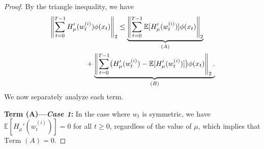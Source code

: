 \documentclass[letterpaper,10pt,conference]{ieeeconf}
\theoremstyle{plain} %
\theoremstyle{plain} %
\theoremstyle{plain} %
\theoremstyle{plain}
\begin{document}
\begin{proof}
By the triangle inequality, we have
\begin{align*}
&\left\| \sum_{t=0}^{T-1} H_\mu'(w_t^{(i)}) \phi (x_t)\right\|_2 \le   \underbrace{\left\| \sum_{t=0}^{T-1} \mathbb{E}[H_\mu'(w_t^{(i)})] \phi (x_t)\right\|_2}_{(A)}\\&\hspace{18mm}+\underbrace{\left\| \sum_{t=0}^{T-1} \bigr(H_\mu'(w_t^{(i)}) - \mathbb{E}[H_\mu'(w_t^{(i)})] \bigr) \phi (x_t)\right\|_2.}_{(B)}
\end{align*}
We now separately analyze each term. 

\medskip
\textbf{Term (A)—\textit{Case 1}:}
In the case where $w_t$ is  symmetric, we have $\mathbb{E}[H_\mu'(w_t^{(i)})]=0$ for all $t\ge 0$, regardless of the value of $\mu$, which implies that $\text{Term~}(A)=0$. 


\end{proof}
\end{document}

